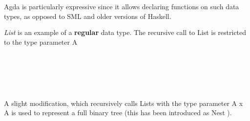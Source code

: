 \documentclass[12pt,twoside,notitlepage]{report}
\begin{document}
Agda is particularly expressive since it allows declaring functions on such data types, as opposed to SML and older versions of Haskell.

\textit{List} is an example of a \textbf{regular} data type. The recursive call to List is restricted to the type parameter A

\begin{code}
\\
\>  \AgdaSymbol{(} \AgdaSymbol{:} \AgdaSymbol{)} \AgdaSymbol{:}  \<%
\\
\>[0]\<[2]%
\>[2]\AgdaInductiveConstructor{[]} \AgdaSymbol{:}  \<%
\\
\>[0]\<[2]%
\>[2] \AgdaSymbol{:}       \<%
\\
\end{code}

A slight modification, which recursively calls Lists with the type parameter A x A is used to represent a full binary tree (this has been introduced as Nest \cite{nested_types}).

\begin{code}
\\
\>  \AgdaSymbol{(} \AgdaSymbol{:} \AgdaSymbol{)} \AgdaSymbol{:}  \<%
\\
\>[0]\<[2]%
\>[2] \AgdaSymbol{:}  \<%
\\
\>[0]\<[2]%
\>[2] \AgdaSymbol{:}    \AgdaSymbol{(}  \AgdaSymbol{)}   \<%
\\
\end{code}

\begin{code}
\\
\> \AgdaSymbol{:}  \<%
\\
\> \AgdaSymbol{=}   \AgdaSymbol{(} \AgdaSymbol{(} \AgdaInductiveConstructor{,} \AgdaSymbol{)} \AgdaSymbol{(} \AgdaSymbol{((} \AgdaInductiveConstructor{,} \AgdaSymbol{)} \AgdaInductiveConstructor{,} \AgdaSymbol{(} \AgdaInductiveConstructor{,} \AgdaSymbol{))} \AgdaSymbol{))}\<%
\\
\end{code}
\end{document}
